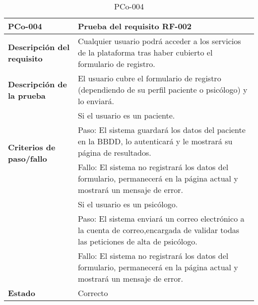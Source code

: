 \begin{table}[htpb]
\centering
\begin{tabularx}{\textwidth}{|l|X|}
\hline
\textbf{PCo-004}                                    & \textbf{Prueba del requisito RF-002}                                                                                                                                                                                                                                                                                                     \\ \hline
\textbf{Descripción del requisito}                & Cualquier usuario podrá acceder a los servicios de la plataforma tras haber cubierto el formulario de registro.                                                                                                                                                                                                                          \\ \hline
\textbf{Descripción de la prueba}                 & El usuario cubre el formulario de registro (dependiendo de su perfil paciente o psicólogo) y lo enviará.                                                                                                                                                                                                                                  \\ \hline
\multirow{3}{*}{\textbf{Criterios de paso/fallo}}  & Si el usuario es un paciente. \\ 
                                                   & Paso: El sistema guardará los datos del paciente en la BBDD, lo autenticará y le mostrará su página de resultados. \\ 
                                                   & Fallo: El sistema no registrará los datos del formulario, permanecerá en la página actual y mostrará un mensaje de error.  \\ \cline{2-2}
                                                   & Si el usuario es un psicólogo. \\ 
                                                   &                                              Paso: El sistema enviará un correo electrónico a la cuenta de correo,encargada de validar todas las peticiones de alta de psicólogo.\\ 
                                                   & Fallo: El sistema no registrará los datos del formulario, permanecerá en la página actual y mostrará un mensaje de error. \\ \hline
\textbf{Estado}                                   & Correcto                                                                                                                                                                                                                                                                                                                                 \\ \hline
\end{tabularx}
\caption{PCo-004}
\end{table}


